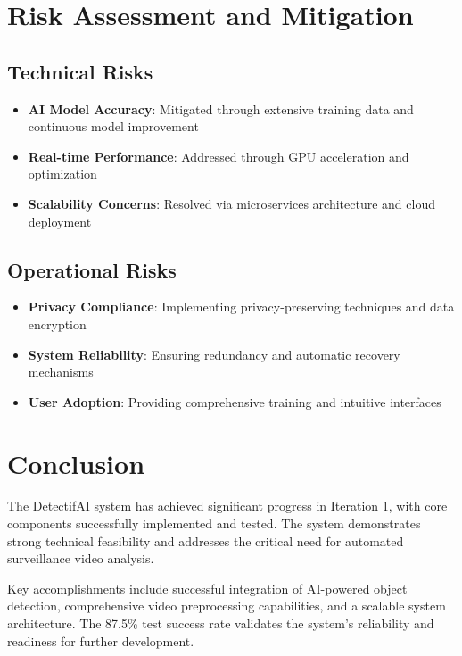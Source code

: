 \documentclass[12pt,a4paper]{article}
\begin{document}
\clearpage

\section{Risk Assessment and Mitigation}

\subsection{Technical Risks}
\begin{itemize}
    \item \textbf{AI Model Accuracy}: Mitigated through extensive training data and continuous model improvement
    \item \textbf{Real-time Performance}: Addressed through GPU acceleration and optimization
    \item \textbf{Scalability Concerns}: Resolved via microservices architecture and cloud deployment
\end{itemize}

\subsection{Operational Risks}
\begin{itemize}
    \item \textbf{Privacy Compliance}: Implementing privacy-preserving techniques and data encryption
    \item \textbf{System Reliability}: Ensuring redundancy and automatic recovery mechanisms
    \item \textbf{User Adoption}: Providing comprehensive training and intuitive interfaces
\end{itemize}

\section{Conclusion}

The DetectifAI system has achieved significant progress in Iteration 1, with core components successfully implemented and tested. The system demonstrates strong technical feasibility and addresses the critical need for automated surveillance video analysis.

Key accomplishments include successful integration of AI-powered object detection, comprehensive video preprocessing capabilities, and a scalable system architecture. The 87.5\% test success rate validates the system's reliability and readiness for further development.
\end{document}
